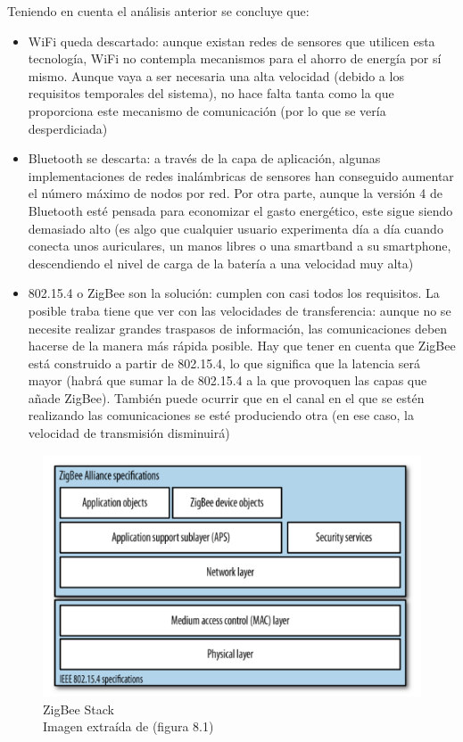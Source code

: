 Teniendo en cuenta el análisis anterior se concluye que:
\begin{itemize}
  \item WiFi queda descartado: aunque existan redes de sensores que utilicen esta tecnología,
  WiFi no contempla mecanismos para el ahorro de energía por sí mismo. Aunque vaya a ser necesaria una alta velocidad
  (debido a los requisitos temporales del sistema), no hace falta tanta como la que
  proporciona este mecanismo de comunicación (por lo que se vería desperdiciada)
  \item Bluetooth se descarta: a través de la capa de aplicación, algunas implementaciones
  de redes inalámbricas de sensores han conseguido aumentar el número máximo de nodos por red.
  Por otra parte, aunque la versión 4 de Bluetooth esté pensada para economizar el gasto energético,
  este sigue siendo demasiado alto (es algo que cualquier usuario experimenta día a día cuando
  conecta unos auriculares, un manos libres o una smartband a su smartphone, descendiendo el nivel de
  carga de la batería a una velocidad muy alta)
  \item 802.15.4 o ZigBee son la solución: cumplen con casi todos los requisitos.
  La posible traba tiene que ver con las velocidades de transferencia: aunque no
  se necesite realizar grandes traspasos de información, las comunicaciones deben
  hacerse de la manera más rápida posible. Hay que tener en cuenta que ZigBee está construido a partir
  de 802.15.4, lo que significa que la latencia será mayor (habrá que sumar la de 802.15.4 a la que provoquen
  las capas que añade ZigBee). También puede ocurrir que en el canal en el que se estén realizando las comunicaciones
  se esté produciendo otra (en ese caso, la velocidad de transmisión disminuirá)
\end{itemize}

\begin{figure}[htb]
\centering
\captionsetup{justification=centering}
\includegraphics[width=1\textwidth]{./imagenes/zigbeestack}
\caption{ZigBee Stack \\
\scriptsize{Imagen extraída de \cite{faludi} (figura 8.1)} } \label{fig:stackzigbee}
\end{figure}

